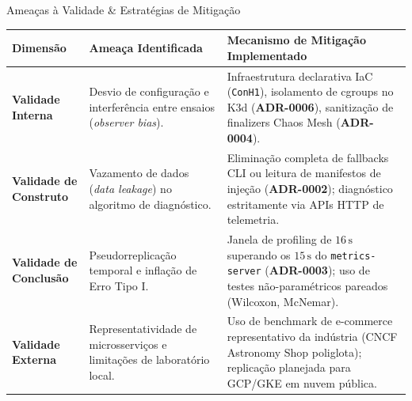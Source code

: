 \documentclass[aspectratio=169, 10pt]{beamer}
\begin{document}
\begin{frame}{Ameaças à Validade \& Estratégias de Mitigação}
  \small
  \begin{tabularx}{\textwidth}{l p{4.5cm} X}
    \toprule
    \textbf{Dimensão} & \textbf{Ameaça Identificada} & \textbf{Mecanismo de Mitigação Implementado} \\
    \midrule
    \textbf{Validade Interna} & Desvio de configuração e interferência entre ensaios (\textit{observer bias}). & Infraestrutura declarativa IaC (\texttt{ConH1}), isolamento de cgroups no K3d (\textbf{ADR-0006}), sanitização de finalizers Chaos Mesh (\textbf{ADR-0004}). \\
    \addlinespace
    \textbf{Validade de Construto} & Vazamento de dados (\textit{data leakage}) no algoritmo de diagnóstico. & Eliminação completa de fallbacks CLI ou leitura de manifestos de injeção (\textbf{ADR-0002}); diagnóstico estritamente via APIs HTTP de telemetria. \\
    \addlinespace
    \textbf{Validade de Conclusão} & Pseudorreplicação temporal e inflação de Erro Tipo I. & Janela de profiling de $16\,\text{s}$ superando os $15\,\text{s}$ do \texttt{metrics-server} (\textbf{ADR-0003}); uso de testes não-paramétricos pareados (Wilcoxon, McNemar). \\
    \addlinespace
    \textbf{Validade Externa} & Representatividade de microsserviços e limitações de laboratório local. & Uso de benchmark de e-commerce representativo da indústria (CNCF Astronomy Shop poliglota); replicação planejada para GCP/GKE em nuvem pública. \\
    \bottomrule
  \end{tabularx}
\end{frame}
\end{document}
